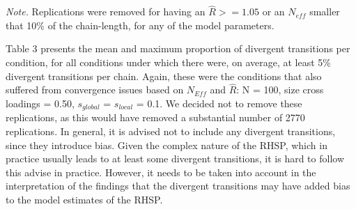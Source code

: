 \documentclass[
  man, donotrepeattitle,floatsintext]{apa6}
\begin{document}
\begin{table}[tbp]
\begin{center}
\begin{threeparttable}
\begin{tablenotes}[para]
\normalsize{\textit{Note.} Replications were removed for having an $\hat{R} >= 1.05$ or an $N_{eff}$  smaller that 10\% of the chain-length, for any of the model parameters.}
\end{tablenotes}

\end{threeparttable}
\end{center}

\end{table}

Table 3 presents the mean and maximum proportion of divergent
transitions per condition, for all conditions under which there were, on
average, at least 5\% divergent transitions per chain. Again, these were
the conditions that also suffered from convergence issues based on
\(N_{Eff}\) and \(\hat{R}\): N = 100, size cross loadings = 0.50,
\(s_{global}\) = \(s_{local}\) = 0.1. We decided not to remove these
replications, as this would have removed a substantial number of 2770
replications. In general, it is advised not to include any divergent
transitions, since they introduce bias. Given the complex nature of the
RHSP, which in practice usually leads to at least some divergent
transitions, it is hard to follow this advise in practice. However, it
needs to be taken into account in the interpretation of the findings
that the divergent transitions may have added bias to the model
estimates of the RHSP.
\end{document}
